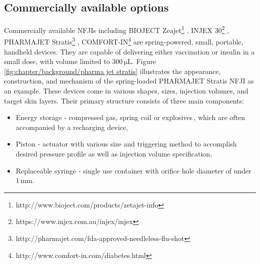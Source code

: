    \subsection{Commercially available options}     \label{Chapter:background/needle-free jet injection/commercially available options}
        
        Commercially available \acsp{NFJI} including BIOJECT Zeajet\footnote{http://www.bioject.com/products/zetajet-info} , INJEX 30\footnote{https://www.injex.com.au/injex/injex} , PHARMAJET Stratis\footnote{http://pharmajet.com/fda-approved-needleless-flu-shot} , COMFORT-IN\footnote{http://www.comfort-in.com/diabetes.html}  are spring-powered, small, portable, handheld devices. They are capable of delivering either vaccination or insulin in a small dose, with volume limited to $\mathrm{300\,\mu L}$. Figure\,\ref{fig:chapter/background/pharma jet stratis} illustrates the appearance, construction, and mechanism of the spring-loaded PHARMAJET Stratis NFJI as an example. These devices come in various shapes, sizes, injection volumes, and target skin layers. Their primary structure consists of three main components:
        \begin{itemize}
            \item Energy storage - compressed gas, spring coil or explosives\,\cite{taberner2012}, which are often accompanied by a recharging device,
            \item Piston - actuator with various size and triggering method to accomplish desired pressure profile as well as injection volume specification,
            \item Replaceable syringe - single use container with orifice hole diameter of under $\mathrm{1\,mm}$.
        \end{itemize}
        
